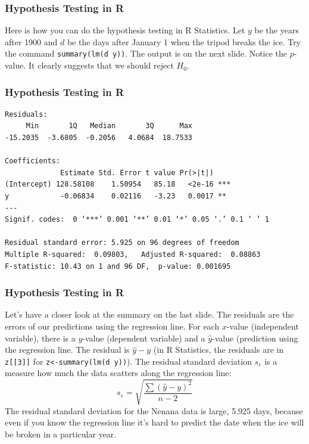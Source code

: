 \documentclass[xcolor=dvipsnames]{beamer}
\begin{document}
\begin{frame}
  \frametitle{Hypothesis Testing in R}
  Here is how you can do the hypothesis testing in R Statistics.
  Let $y$ be the years after 1900 and $d$ be the days after January 1
  when the tripod breaks the ice. Try the command
  \texttt{summary(lm(d~y))}. The output is on the next slide. Notice
  the $p$-value. It clearly suggests that we should reject $H_{0}$.
\end{frame}

\begin{frame}
  \frametitle{Hypothesis Testing in R}
\begin{verbatim}
Residuals:
     Min       1Q   Median       3Q      Max 
-15.2035  -3.6805  -0.2056   4.0684  18.7533 

Coefficients:
             Estimate Std. Error t value Pr(>|t|)    
(Intercept) 128.58108    1.50954   85.18   <2e-16 ***
y            -0.06834    0.02116   -3.23   0.0017 ** 
---
Signif. codes:  0 ‘***’ 0.001 ‘**’ 0.01 ‘*’ 0.05 ‘.’ 0.1 ‘ ’ 1

Residual standard error: 5.925 on 96 degrees of freedom
Multiple R-squared:  0.09803,	Adjusted R-squared:  0.08863 
F-statistic: 10.43 on 1 and 96 DF,  p-value: 0.001695
\end{verbatim}
\end{frame}

\begin{frame}
  \frametitle{Hypothesis Testing in R}
  Let's have a closer look at the summary on the last slide. The
  \alert{residuals} are the errors of our predictions using the
  regression line. For each $x$-value (independent variable), there is
  a $y$-value (dependent variable) and a $\hat{y}$-value (prediction
  using the regression line. The residual is $\hat{y}-y$ (in R
  Statistics, the residuals are in \texttt{z[[3]]} for
  \texttt{z<-summary(lm(d~y))}). The residual standard deviation
  $s_{e}$ is a measure how much the data scatters along the regression
  line:
  \begin{equation}
    \label{eq:eilokaqu}
    s_{e}=\sqrt{\frac{\sum(\hat{y}-y)^{2}}{n-2}}
  \end{equation}
  The residual standard deviation for the Nenana data is large, 5.925
  days, because even if you know the regression line it's hard to
  predict the date when the ice will be broken in a particular year.
\end{frame}
\end{document}
